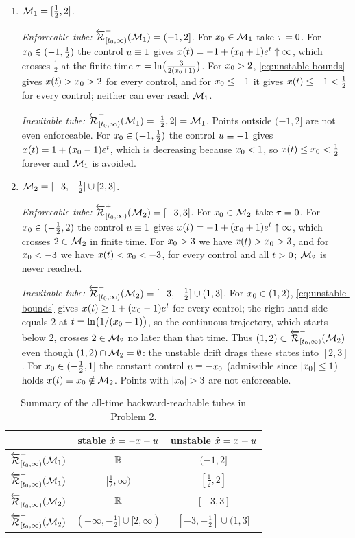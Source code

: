 \begin{enumerate}[label=(\alph*), itemsep=3pt]
\item $\mathcal{M}_1=[\tfrac12,2]$.

\emph{Enforceable tube:} ${\overleftarrow{{\mathcal{R}}}}^+_{[{t}_0,\infty)}(\mathcal{M}_1)=(-1,2]$.
For ${x}_0\in\mathcal{M}_1$ take ${\tau}=0$. For ${x}_0\in(-1,\tfrac12)$ the control ${u}\equiv1$
gives ${x}({t})=-1+({x}_0+1)e^{{t}}\uparrow\infty$, which crosses $\tfrac12$ at the finite
time ${\tau}=\ln\bigl(\tfrac{3}{2({x}_0+1)}\bigr)$. For ${x}_0>2$, \eqref{eq:unstable-bounds}
gives ${x}({t})>{x}_0>2$ for every control, and for ${x}_0\le-1$ it gives
${x}({t})\le-1<\tfrac12$ for every control; neither can ever reach $\mathcal{M}_1$.

\emph{Inevitable tube:} ${\overleftarrow{{\mathcal{R}}}}^-_{[{t}_0,\infty)}(\mathcal{M}_1)=[\tfrac12,2]=\mathcal{M}_1$.
Points outside $(-1,2]$ are not even enforceable. For ${x}_0\in(-1,\tfrac12)$ the control
${u}\equiv-1$ gives ${x}({t})=1+({x}_0-1)e^{{t}}$, which is decreasing because
${x}_0<1$, so ${x}({t})\le{x}_0<\tfrac12$ forever and $\mathcal{M}_1$ is avoided.

\item $\mathcal{M}_2=[-3,-\tfrac12]\cup[2,3]$.

\emph{Enforceable tube:} ${\overleftarrow{{\mathcal{R}}}}^+_{[{t}_0,\infty)}(\mathcal{M}_2)=[-3,3]$.
For ${x}_0\in\mathcal{M}_2$ take ${\tau}=0$. For ${x}_0\in(-\tfrac12,2)$ the control ${u}\equiv1$
gives ${x}({t})=-1+({x}_0+1)e^{{t}}\uparrow\infty$, which crosses $2\in\mathcal{M}_2$ in finite
time. For ${x}_0>3$ we have ${x}({t})>{x}_0>3$, and for ${x}_0<-3$ we have
${x}({t})<{x}_0<-3$, for every control and all ${t}>0$; $\mathcal{M}_2$ is never reached.

\emph{Inevitable tube:} ${\overleftarrow{{\mathcal{R}}}}^-_{[{t}_0,\infty)}(\mathcal{M}_2)=[-3,-\tfrac12]\cup(1,3]$.
For ${x}_0\in(1,2)$, \eqref{eq:unstable-bounds} gives ${x}({t})\ge1+({x}_0-1)e^{{t}}$
for every control; the right-hand side equals $2$ at ${t}=\ln\bigl(1/({x}_0-1)\bigr)$, so the
continuous trajectory, which starts below $2$, crosses $2\in\mathcal{M}_2$ no later than that time. Thus
$(1,2)\subset{\overleftarrow{{\mathcal{R}}}}^-_{[{t}_0,\infty)}(\mathcal{M}_2)$ even though $(1,2)\cap\mathcal{M}_2=\emptyset$: the unstable drift drags these
states into $[2,3]$. For ${x}_0\in(-\tfrac12,1]$ the constant control ${u}\equiv-{x}_0$
(admissible since $|{x}_0|\le1$) holds ${x}({t})\equiv{x}_0\notin\mathcal{M}_2$. Points with
$|\state_0|>3$ are not enforceable.
\end{enumerate}

\begin{table}[h]
\centering
\begin{tabular}{lcc}
\hline
 & stable $\dot{{x}}=-{x}+{u}$ & unstable $\dot{{x}}={x}+{u}$ \\
\hline
${\overleftarrow{{\mathcal{R}}}}^+_{[{t}_0,\infty)}(\mathcal{M}_1)$ & $\mathbb{R}$ & $(-1,2]$ \\
${\overleftarrow{{\mathcal{R}}}}^-_{[{t}_0,\infty)}(\mathcal{M}_1)$ & $[\tfrac12,\infty)$ & $[\tfrac12,2]$ \\
${\overleftarrow{{\mathcal{R}}}}^+_{[{t}_0,\infty)}(\mathcal{M}_2)$ & $\mathbb{R}$ & $[-3,3]$ \\
${\overleftarrow{{\mathcal{R}}}}^-_{[{t}_0,\infty)}(\mathcal{M}_2)$ & $(-\infty,-\tfrac12]\cup[2,\infty)$ & $[-3,-\tfrac12]\cup(1,3]$ \\
\hline
\end{tabular}
\caption{Summary of the all-time backward-reachable tubes in Problem 2.}
\end{table}

